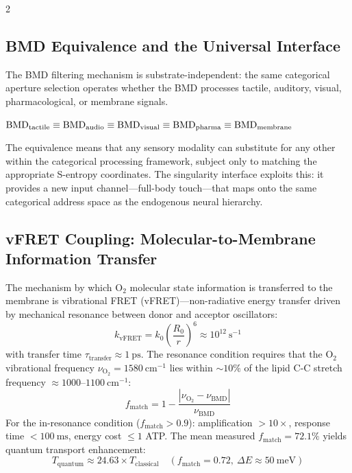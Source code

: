 \begin{multicols}{2}

\subsection{BMD Equivalence and the Universal Interface}

The BMD filtering mechanism is substrate-independent: the same categorical aperture selection operates whether the BMD processes tactile, auditory, visual, pharmacological, or membrane signals.

\begin{axiom}
\label{ax:bmd_equiv}
$\mathrm{BMD}_{\mathrm{tactile}} \equiv \mathrm{BMD}_{\mathrm{audio}} \equiv \mathrm{BMD}_{\mathrm{visual}} \equiv \mathrm{BMD}_{\mathrm{pharma}} \equiv \mathrm{BMD}_{\mathrm{membrane}}$
\end{axiom}

The equivalence means that any sensory modality can substitute for any other within the categorical processing framework, subject only to matching the appropriate S-entropy coordinates. The singularity interface exploits this: it provides a new input channel---full-body touch---that maps onto the same categorical address space as the endogenous neural hierarchy.

\subsection{vFRET Coupling: Molecular-to-Membrane Information Transfer}

The mechanism by which O$_2$ molecular state information is transferred to the membrane is vibrational FRET (vFRET)---non-radiative energy transfer driven by mechanical resonance between donor and acceptor oscillators:
\begin{equation}
k_{\mathrm{vFRET}} = k_0 \left(\frac{R_0}{r}\right)^6 \approx 10^{12}\ \mathrm{s}^{-1}
\label{eq:ch11_vfret}
\end{equation}
with transfer time $\tau_{\mathrm{transfer}} \approx 1\ \mathrm{ps}$. The resonance condition requires that the O$_2$ vibrational frequency $\nu_{\mathrm{O_2}} = 1580\ \mathrm{cm}^{-1}$ lies within $\sim 10\%$ of the lipid C-C stretch frequency $\approx 1000$--$1100\ \mathrm{cm}^{-1}$:
\begin{equation}
f_{\mathrm{match}} = 1 - \frac{|\nu_{\mathrm{O_2}} - \nu_{\mathrm{BMD}}|}{\nu_{\mathrm{BMD}}}
\label{eq:ch11_fmatch}
\end{equation}
For the in-resonance condition ($f_{\mathrm{match}} > 0.9$): amplification $> 10\times$, response time $< 100\ \mathrm{ms}$, energy cost $\leq 1$ ATP. The mean measured $f_{\mathrm{match}} = 72.1\%$ yields quantum transport enhancement:
\begin{equation}
T_{\mathrm{quantum}} \approx 24.63 \times T_{\mathrm{classical}} \quad (f_{\mathrm{match}} = 0.72,\ \Delta E \approx 50\ \mathrm{meV})
\label{eq:ch11_quantum}
\end{equation}


\end{multicols}
